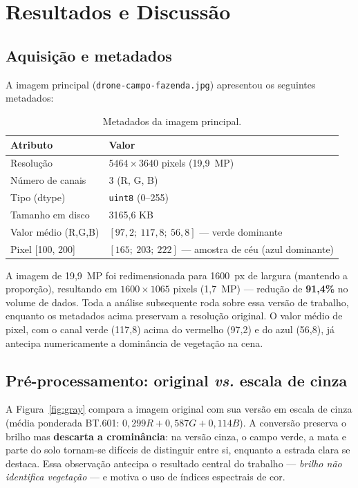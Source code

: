 \documentclass[12pt,a4paper]{article}
\begin{document}
\section{Resultados e Discussão}
\label{sec:results}

\subsection{Aquisição e metadados}
A imagem principal (\texttt{drone-campo-fazenda.jpg}) apresentou os seguintes metadados:

\begin{table}[H]
\centering
\caption{Metadados da imagem principal.}
\begin{tabular}{ll}
\toprule
\textbf{Atributo} & \textbf{Valor} \\
\midrule
Resolução           & $5464 \times 3640$ pixels (19,9~MP) \\
Número de canais    & 3 (R, G, B) \\
Tipo (dtype)        & \texttt{uint8} (0--255) \\
Tamanho em disco    & 3165,6 KB \\
Valor médio (R,G,B) & $[97{,}2;\ 117{,}8;\ 56{,}8]$ --- verde dominante \\
Pixel [100, 200]    & $[165;\ 203;\ 222]$ --- amostra de céu (azul dominante) \\
\bottomrule
\end{tabular}
\end{table}

\noindent
A imagem de 19,9~MP foi redimensionada para 1600~px de largura (mantendo a proporção),
resultando em $1600 \times 1065$ pixels (1,7~MP) --- redução de \textbf{91,4\%} no volume de
dados. Toda a análise subsequente roda sobre essa versão de trabalho, enquanto os metadados
acima preservam a resolução original. O valor médio de pixel, com o canal verde (117,8) acima
do vermelho (97,2) e do azul (56,8), já antecipa numericamente a dominância de vegetação na cena.

\subsection{Pré-processamento: original \emph{vs.} escala de cinza}
A Figura~\ref{fig:gray} compara a imagem original com sua versão em escala de cinza
(média ponderada BT.601: $0{,}299R + 0{,}587G + 0{,}114B$). A conversão preserva o brilho mas
\textbf{descarta a crominância}: na versão cinza, o campo verde, a mata e parte do solo tornam-se
difíceis de distinguir entre si, enquanto a estrada clara se destaca. Essa observação antecipa o
resultado central do trabalho --- \emph{brilho não identifica vegetação} --- e motiva o uso de
índices espectrais de cor.
\end{document}
